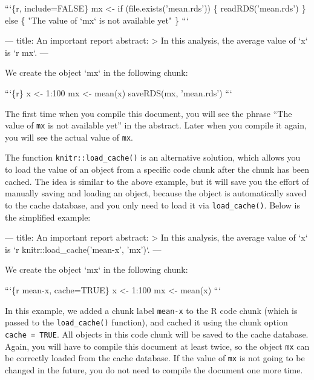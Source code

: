 \documentclass[
  11pt,
]{krantz}
\newenvironment{Shaded}{\begin{snugshade}}{\end{snugshade}}
\newcommand{\BaseNTok}[1]{\textcolor[rgb]{0.06,0.06,0.06}{#1}}
\newcommand{\NormalTok}[1]{#1}
\begin{document}
\begin{Shaded}
\begin{Highlighting}[]
\BaseNTok{```\{r, include=FALSE\}}
\BaseNTok{mx <- if (file.exists('mean.rds')) \{}
\BaseNTok{  readRDS('mean.rds')}
\BaseNTok{\} else \{}
\BaseNTok{  "The value of `mx` is not available yet"}
\BaseNTok{\}}
\BaseNTok{```}

\NormalTok{---}
\NormalTok{title: An important report}
\NormalTok{abstract: >}
\NormalTok{  In this analysis, the average value of}
  \BaseNTok{`x`}\NormalTok{ is }\BaseNTok{`r mx`}\NormalTok{.}
\NormalTok{---}

\NormalTok{We create the object }\BaseNTok{`mx`}\NormalTok{ in the following chunk:}

\BaseNTok{```\{r\}}
\BaseNTok{x <- 1:100}
\BaseNTok{mx <- mean(x)}
\BaseNTok{saveRDS(mx, 'mean.rds')}
\BaseNTok{```}
\end{Highlighting}
\end{Shaded}

The first time when you compile this document, you will see the phrase ``The value of \texttt{mx} is not available yet'' in the abstract. Later when you compile it again, you will see the actual value of \texttt{mx}.

The function \texttt{knitr::load\_cache()} is an alternative solution, which allows you to load the value of an object from a specific code chunk after the chunk has been cached. The idea is similar to the above example, but it will save you the effort of manually saving and loading an object, because the object is automatically saved to the cache database, and you only need to load it via \texttt{load\_cache()}. Below is the simplified example:

\begin{Shaded}
\begin{Highlighting}[]
\NormalTok{---}
\NormalTok{title: An important report}
\NormalTok{abstract: >}
\NormalTok{  In this analysis, the average value of}
  \BaseNTok{`x`}\NormalTok{ is }\BaseNTok{`r knitr::load_cache('mean-x', 'mx')`}\NormalTok{.}
\NormalTok{---}

\NormalTok{We create the object }\BaseNTok{`mx`}\NormalTok{ in the following chunk:}

\BaseNTok{```\{r mean-x, cache=TRUE\}}
\BaseNTok{x <- 1:100}
\BaseNTok{mx <- mean(x)}
\BaseNTok{```}
\end{Highlighting}
\end{Shaded}

In this example, we added a chunk label \texttt{mean-x} to the R code chunk (which is passed to the \texttt{load\_cache()} function), and cached it using the chunk option \texttt{cache\ =\ TRUE}. All objects in this code chunk will be saved to the cache database. Again, you will have to compile this document at least twice, so the object \texttt{mx} can be correctly loaded from the cache database. If the value of \texttt{mx} is not going to be changed in the future, you do not need to compile the document one more time.
\end{document}
